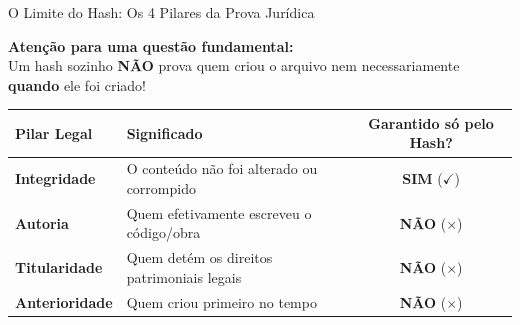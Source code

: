 \documentclass[9pt]{beamer}
\begin{document}
\begin{frame}{O Limite do Hash: Os 4 Pilares da Prova Jurídica}
  \begin{center}
    \large\color{mRed}\textbf{Atenção para uma questão fundamental:}\\
    \small Um hash sozinho \textbf{NÃO} prova quem criou o arquivo nem necessariamente \textbf{quando} ele foi criado!
  \end{center}

  \vspace{0.2cm}

  \begin{center}
    \renewcommand{\arraystretch}{1.2}
    \footnotesize
    \begin{tabular}{lp{5.2cm}c}
      \toprule
      \textbf{\color{structure.fg}Pilar Legal} & \textbf{\color{structure.fg}Significado} & \textbf{\color{structure.fg}Garantido só pelo Hash?} \\
      \midrule
      \textbf{Integridade} & O conteúdo não foi alterado ou corrompido & \color{mGreen}\textbf{SIM} ($\checkmark$) \\
      \textbf{Autoria} & Quem efetivamente escreveu o código/obra & \color{mRed}\textbf{NÃO} ($\boldsymbol{\times}$) \\
      \textbf{Titularidade} & Quem detém os direitos patrimoniais legais & \color{mRed}\textbf{NÃO} ($\boldsymbol{\times}$) \\
      \textbf{Anterioridade} & Quem criou primeiro no tempo & \color{mRed}\textbf{NÃO} ($\boldsymbol{\times}$) \\
      \bottomrule
    \end{tabular}
  \end{center}
\end{frame}
\end{document}
